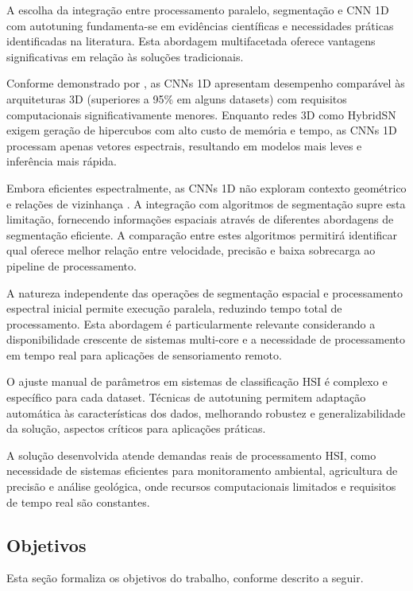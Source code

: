 \documentclass[a4paper,12pt,brazil]{article} %
\begin{document}
A escolha da integração entre processamento paralelo, segmentação e CNN 1D com autotuning fundamenta-se em evidências científicas e necessidades práticas identificadas na literatura. Esta abordagem multifacetada oferece vantagens significativas em relação às soluções tradicionais.

Conforme demonstrado por \cite{viel2023hyperspectral}, as CNNs 1D apresentam desempenho comparável às arquiteturas 3D (superiores a 95\% em alguns datasets) com requisitos computacionais significativamente menores. Enquanto redes 3D como HybridSN \cite{roy2020hybridsn} exigem geração de hipercubos com alto custo de memória e tempo, as CNNs 1D processam apenas vetores espectrais, resultando em modelos mais leves e inferência mais rápida.

Embora eficientes espectralmente, as CNNs 1D não exploram contexto geométrico e relações de vizinhança \cite{paoletti2019deep}. A integração com algoritmos de segmentação supre esta limitação, fornecendo informações espaciais através de diferentes abordagens de segmentação eficiente. A comparação entre estes algoritmos permitirá identificar qual oferece melhor relação entre velocidade, precisão e baixa sobrecarga ao pipeline de processamento.

A natureza independente das operações de segmentação espacial e processamento espectral inicial permite execução paralela, reduzindo tempo total de processamento. Esta abordagem é particularmente relevante considerando a disponibilidade crescente de sistemas multi-core e a necessidade de processamento em tempo real para aplicações de sensoriamento remoto.

O ajuste manual de parâmetros em sistemas de classificação HSI é complexo e específico para cada dataset. Técnicas de autotuning permitem adaptação automática às características dos dados, melhorando robustez e generalizabilidade da solução, aspectos críticos para aplicações práticas.

A solução desenvolvida atende demandas reais de processamento HSI, como necessidade de sistemas eficientes para monitoramento ambiental, agricultura de precisão e análise geológica, onde recursos computacionais limitados e requisitos de tempo real são constantes.
 

\subsection{Objetivos}

Esta seção formaliza os objetivos do trabalho, conforme descrito a seguir.
\end{document}
